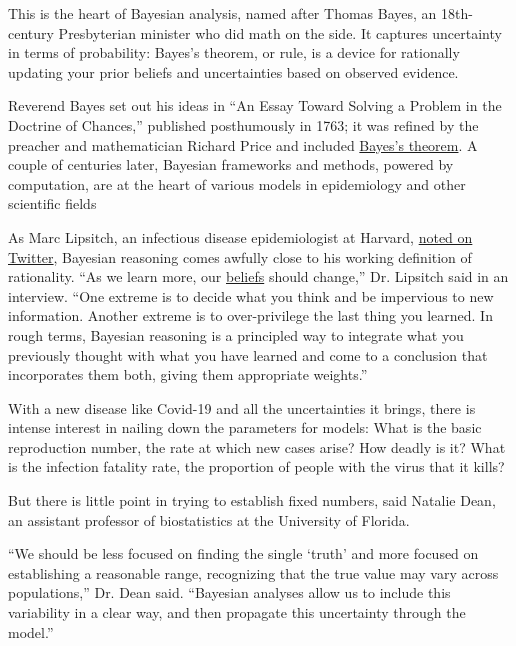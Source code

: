 This is the heart of Bayesian analysis, named after Thomas Bayes, an
18th-century Presbyterian minister who did math on the side. It captures
uncertainty in terms of probability: Bayes's theorem, or rule, is a
device for rationally updating your prior beliefs and uncertainties
based on observed evidence.

Reverend Bayes set out his ideas in ``An Essay Toward Solving a Problem
in the Doctrine of Chances,'' published posthumously in 1763; it was
refined by the preacher and mathematician Richard Price and included
\href{https://www.nytimes3xbfgragh.onion/2011/08/07/books/review/the-theory-that-would-not-die-by-sharon-bertsch-mcgrayne-book-review.html?searchResultPosition=7}{Bayes's
theorem}. A couple of centuries later, Bayesian frameworks and methods,
powered by computation, are at the heart of various models in
epidemiology and other scientific fields

As Marc Lipsitch, an infectious disease epidemiologist at Harvard,
\href{https://twitter.com/mlipsitch/status/1257858402186940421}{noted on
Twitter}, Bayesian reasoning comes awfully close to his working
definition of rationality. ``As we learn more, our
\href{https://twitter.com/CT_Bergstrom/status/1276742731948158976}{beliefs}
should change,'' Dr. Lipsitch said in an interview. ``One extreme is to
decide what you think and be impervious to new information. Another
extreme is to over-privilege the last thing you learned. In rough terms,
Bayesian reasoning is a principled way to integrate what you previously
thought with what you have learned and come to a conclusion that
incorporates them both, giving them appropriate weights.''

With a new disease like Covid-19 and all the uncertainties it brings,
there is intense interest in nailing down the parameters for models:
What is the basic reproduction number, the rate at which new cases
arise? How deadly is it? What is the infection fatality rate, the
proportion of people with the virus that it kills?

But there is little point in trying to establish fixed numbers, said
Natalie Dean, an assistant professor of biostatistics at the University
of Florida.

``We should be less focused on finding the single `truth' and more
focused on establishing a reasonable range, recognizing that the true
value may vary across populations,'' Dr. Dean said. ``Bayesian analyses
allow us to include this variability in a clear way, and then propagate
this uncertainty through the model.''

